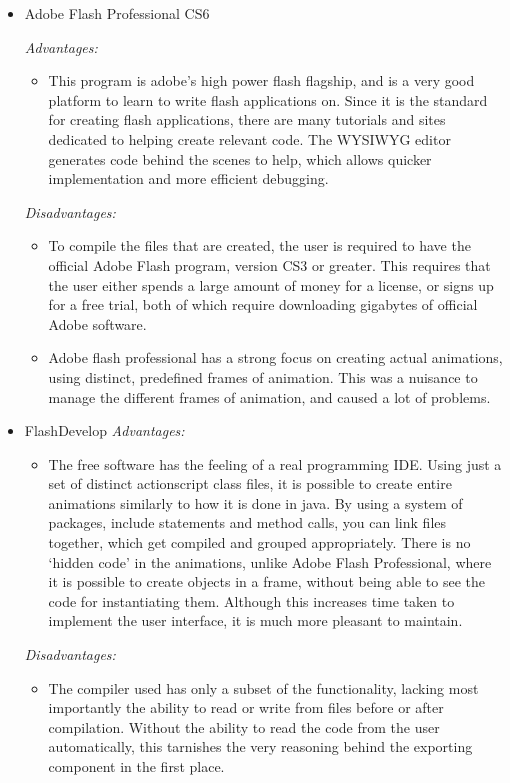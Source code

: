 \documentclass{l3proj}
\begin{document}
\begin{itemize}

\item Adobe Flash Professional CS6	

\textit{Advantages:}
\begin{itemize}
\item		This program is adobe’s high power flash flagship, and is a very good platform to learn to write flash applications on. Since it is the standard for creating flash applications, there are many tutorials and sites dedicated to helping create relevant code. The WYSIWYG editor generates code behind the scenes to help, which allows quicker implementation and more efficient debugging.
\end{itemize}

\textit{Disadvantages:}
\begin{itemize}
\item	To compile the files that are created, the user is required to have the official Adobe Flash program, version CS3 or greater. This requires that the user either spends a large amount of money for a license, or signs up for a free trial, both of which require downloading gigabytes of official Adobe software.
\item	Adobe flash professional has a strong focus on creating actual animations, using distinct, predefined frames of animation. This was a nuisance to manage the different frames of animation, and caused a lot of problems.
\end{itemize}

\item FlashDevelop
\textit{Advantages:}
\begin{itemize}
\item	The free software has the feeling of a real programming IDE. Using just a set of distinct actionscript class files, it is possible to create entire animations similarly to how it is done in java. By using a system of packages, include statements and method calls, you can link files together, which get compiled and grouped appropriately. There is no ‘hidden code’ in the animations, unlike Adobe Flash Professional, where it is possible to create objects in a frame, without being able to see the code for instantiating them. Although this increases time taken to implement the user interface, it is much more pleasant to maintain.
\end{itemize}

\textit{Disadvantages:}
\begin{itemize}
\item	The compiler used has only a subset of the functionality, lacking most importantly the ability to read or write from files before or after compilation. Without the ability to read the code from the user automatically, this tarnishes the very reasoning behind  the exporting component in the first place.
\end{itemize}


\end{itemize}
\end{document}
